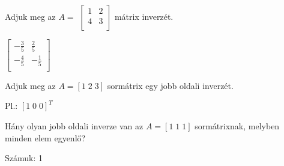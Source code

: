 \begin{frame}
  \begin{tcolorbox}[title={6/5. {\symknight}}]
     Adjuk meg az $A =$ $\begin{bmatrix} 
  				1 & 2 \\
  				4 & 3 \\
			\end{bmatrix}$ mátrix inverzét.
  \tcblower

    \mmedskip 
    
    $\begin{bmatrix} 
  			-{\frac{3}{5}} & {\frac{2}{5}} \\
  			-{\frac{4}{5}} & -{\frac{1}{5}} \\
			\end{bmatrix}$
  \end{tcolorbox}
\end{frame}


\begin{frame}
  \begin{tcolorbox}[title={6/6. {\symknight}}]
     Adjuk meg az $A = [1 \; 2 \; 3]$ sormátrix egy jobb oldali inverzét.
  \tcblower

    \mmedskip 
    
     Pl.: $[1 \; 0 \; 0]^T$
  \end{tcolorbox}
\end{frame}


\begin{frame}
  \begin{tcolorbox}[title={6/7. {\symknight}}]
     Hány olyan jobb oldali inverze van az $A = [1 \; 1 \; 1]$ sormátrixnak, melyben minden elem egyenlő?
  \tcblower

    \mmedskip 
    
     Számuk: 1
  \end{tcolorbox}
\end{frame}


